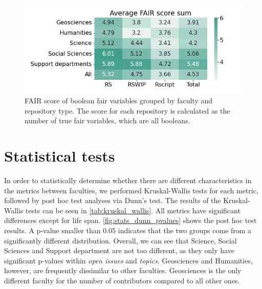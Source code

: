 \begin{figure}[tbph!]
\centerline{
\includegraphics[scale=0.5]{figures_results/heatmap_fair_score.png}}
\vspace{-0.3cm}
\caption{FAIR score of boolean \acrshort{fair} variables grouped by faculty and repository type. The score for each repository is calculated as the number of true \acrshort{fair} variables, which are all booleans. 
\label{fig:fair_score}}
\end{figure}


\vspace{-0.2cm}
\section{Statistical tests}
\label{sec:stattests}
In order to statistically determine whether there are different characteristics in the metrics between faculties, we performed Kruskal-Wallis tests for each metric, followed by post hoc test analyses via Dunn's test. The results of the Kruskal-Wallis tests can be seen in \autoref{tab:kruskal_wallis}. All metrics have significant differences except for life span. \autoref{fig:stats_dunn_pvalues} shows the post hoc test results. A p-value smaller than 0.05 indicates that the two groups come from a significantly different distribution. Overall, we can see that Science, Social Sciences and Support department are not too different, as they only have significant p-values within \textit{open issues} and \textit{topics}. Geosciences and Humanities, however, are frequently dissimilar to other faculties. Geosciences is the only different faculty for the number of contributors compared to all other ones.




